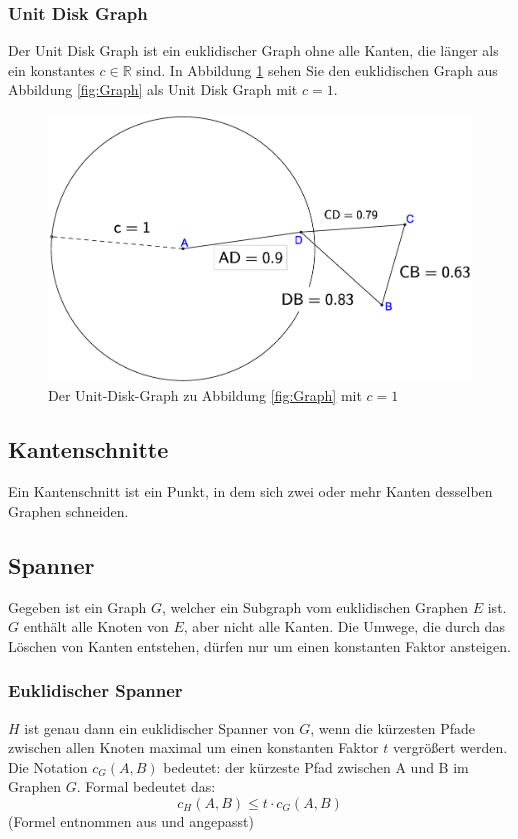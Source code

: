 \documentclass[a4paper,twoside]{IEEEtran}
\begin{document}
\subsubsection{Unit Disk Graph}
Der Unit Disk Graph ist ein euklidischer Graph ohne alle Kanten, die länger als ein konstantes $c \in \mathds{R} $ sind.
In Abbildung \ref{fig:UnitGraph} sehen Sie den euklidischen Graph aus Abbildung \ref{fig:Graph} als Unit Disk Graph mit $c = 1 $.
\begin{figure}[h!]
\centering
\includegraphics[width=0.99\linewidth]{UnitGraph.eps}
\caption{Der Unit-Disk-Graph zu Abbildung \ref{fig:Graph} mit $c = 1 $}
\label{fig:UnitGraph}
\end{figure}

\subsection{Kantenschnitte} \label{Kantenschnitt}
Ein Kantenschnitt ist ein Punkt, in dem sich zwei oder mehr Kanten desselben Graphen schneiden.


\subsection{Spanner}
Gegeben ist ein Graph $G $, welcher ein Subgraph vom euklidischen Graphen $E $ ist.
$G $ enthält alle Knoten von $E $, aber nicht alle Kanten. 
Die Umwege, die durch das Löschen von Kanten entstehen, dürfen nur um einen konstanten Faktor ansteigen. 

\subsubsection{Euklidischer Spanner}
$H $ ist genau dann ein euklidischer Spanner von $G $, wenn die kürzesten Pfade zwischen allen Knoten maximal um einen konstanten Faktor $t $ vergrößert werden.
Die Notation $c_{G}(A, B) $ bedeutet: der kürzeste Pfad zwischen A und B im Graphen $G $.
Formal bedeutet das:
\begin{equation}
	c_H(A, B) \leq t \cdot c_G(A, B)
\end{equation}
{\footnotesize (Formel entnommen aus \cite{kanj} und angepasst)}
\end{document}
